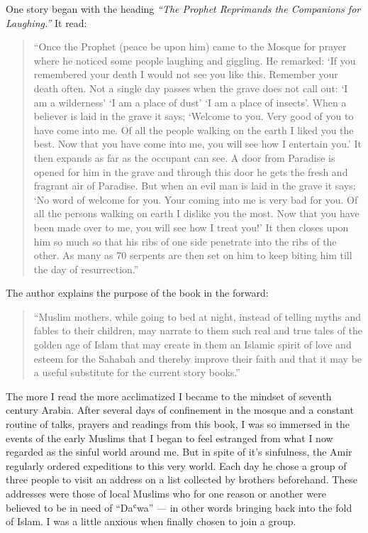 \documentclass[12pt]{memoir}
\def\`{ʿ} %
\newcommand{\cmt}[2]{#1} %
\newcommand{\cor}[2]{#2} %
\begin{document}
One story began with the heading
\emph{“The Prophet Reprimands the \cor{companions}{Companions}
for Laughing.”}
It read:

\begin{quote}
“Once the Prophet (peace be upon him) came to the Mosque for prayer
where he noticed some people laughing and giggling.
He remarked: ‘If you remembered your death I would not see you like this.
Remember your death often.
Not a single day passes when the grave does not call out:
‘I am a wilderness’ ‘I am a place of dust’ ‘I am a place of insects’.
When a believer is laid in the grave it says;
‘Welcome to you.
Very good of you to have come into me.
Of all the people walking on the earth I liked you the best.
Now that you have come into me, you will see how I entertain you.’
It then expands as far as the occupant can see.
A door from Paradise is opened for him in the grave
and through this door he gets the fresh and fragrant air of Paradise.
But when an evil man is laid in the grave it says;
‘No word of welcome for you.
Your coming into me is very bad for you.
Of all the persons walking on earth I dislike you the most.
Now that you have been made over to me, you will see how I treat you!’
It then closes upon him so much so that his ribs
of one side penetrate into the ribs of the other.
As many as 70 serpents are then set on him
to keep biting him till the day of resurrection.”
\end{quote}

The author explains the purpose of the book in the forward:

\begin{quote}
“Muslim mothers, while going to bed at night,
instead of telling myths and fables to their children,
may narrate to them such real and true tales of the golden age of Islam
that may create in them an Islamic spirit of love and esteem for the Sahabah
and thereby improve their faith and that it may be
a useful substitute for the current story books.”
\end{quote}

The more I read the more acclimatized I became
to the mindset of seventh century Arabia.
After several days of confinement in the mosque
and a constant routine of talks, prayers and readings from this book,
I was so immersed in the events of the early Muslims
that I began to feel estranged from what I now regarded
as the sinful world around me.
But in spite of it’s sinfulness,
the Amir regularly ordered expeditions to this very world.
Each day he chose a group of three people to visit an address
on a list collected by brothers beforehand.
These addresses were those of local Muslims
who for one reason or another were believed to be in need of “Da\`wa” —
in other words bringing back into the fold of Islam.
I was a little anxious when finally chosen to join a group.
\end{document}
